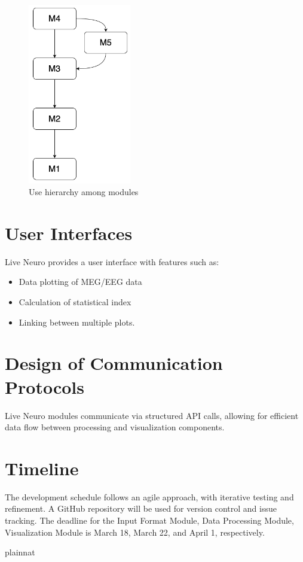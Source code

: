 \documentclass[12pt, titlepage]{article}
\begin{document}
\begin{figure}[H]
\centering
\includegraphics[width=0.4\textwidth]{UseHierarchy.png}
\caption{Use hierarchy among modules}
\label{FigUH}
\end{figure}


\section{User Interfaces}

Live Neuro provides a user interface with features such as:

\begin{itemize}
\item Data plotting of MEG/EEG data


\item Calculation of statistical index


\item Linking between multiple plots.


\end{itemize}


\section{Design of Communication Protocols}

Live Neuro modules communicate via structured API calls, allowing for efficient data flow between processing and visualization components.



\section{Timeline}

The development schedule follows an agile approach, with iterative testing and refinement. A GitHub repository will be used for version control and issue tracking.
The deadline for the Input Format Module, Data Processing Module, Visualization Module is March 18, March 22, and April 1, respectively.


 {plainnat}


\newpage{}
\end{document}
